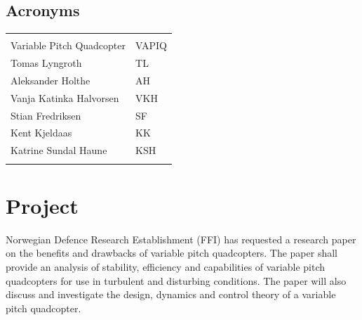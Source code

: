 \documentclass{article}
\begin{document}
\vspace*{3.0 cm}

\begin{center}
\section*{\textbf{Acronyms}}
\begin{tabular}{ll}
\rowcolor{cadetgrey}
    &   \\
Variable Pitch Quadcopter   & VAPIQ \\\rowcolor{gainsboro}
Tomas Lyngroth       & TL          \\ 
Aleksander Holthe      & AH          \\\rowcolor{gainsboro}
Vanja Katinka Halvorsen     & VKH   \\
Stian Fredriksen      & SF          \\\rowcolor{gainsboro}
Kent Kjeldaas         & KK          \\
Katrine Sundal Haune  & KSH         \\\rowcolor{gainsboro}
\end{tabular}                                                             
\end{center}
\newpage


\tableofcontents
\newpage

\section{Project}
Norwegian Defence Research Establishment (FFI) has requested a research paper on the benefits and drawbacks of variable pitch quadcopters. The paper shall provide an analysis of stability, efficiency and capabilities of variable pitch quadcopters for use in turbulent and disturbing conditions. The paper will also discuss and investigate the design, dynamics and control theory of a variable pitch quadcopter.
\end{document}
